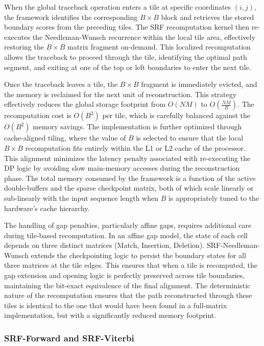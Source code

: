 When the global traceback operation enters a tile at specific coordinates $(i, j)$, the framework identifies the corresponding $B \times B$ block and retrieves the stored boundary scores from the preceding tiles. The SRF recomputation kernel then re-executes the Needleman-Wunsch recurrence within the local tile area, effectively restoring the $B \times B$ matrix fragment on-demand. This localized recomputation allows the traceback to proceed through the tile, identifying the optimal path segment, and exiting at one of the top or left boundaries to enter the next tile.

Once the traceback leaves a tile, the $B \times B$ fragment is immediately evicted, and the memory is reclaimed for the next unit of reconstruction. This strategy effectively reduces the global storage footprint from $O(NM)$ to $O(\frac{NM}{B})$. The recomputation cost is $O(B^2)$ per tile, which is carefully balanced against the $O(B^2)$ memory savings. The implementation is further optimized through cache-aligned tiling, where the value of $B$ is selected to ensure that the local $B \times B$ recomputation fits entirely within the L1 or L2 cache of the processor. This alignment minimizes the latency penalty associated with re-executing the DP logic by avoiding slow main-memory accesses during the reconstruction phase. The total memory consumed by the framework is a function of the active double-buffers and the sparse checkpoint matrix, both of which scale linearly or sub-linearly with the input sequence length when $B$ is appropriately tuned to the hardware's cache hierarchy.

The handling of gap penalties, particularly affine gaps, requires additional care during tile-based recomputation. In an affine gap model, the state of each cell depends on three distinct matrices (Match, Insertion, Deletion). SRF-Needleman-Wunsch extends the checkpointing logic to persist the boundary states for all three matrices at the tile edges. This ensures that when a tile is recomputed, the gap extension and opening logic is perfectly preserved across tile boundaries, maintaining the bit-exact equivalence of the final alignment. The deterministic nature of the recomputation ensures that the path reconstructed through these tiles is identical to the one that would have been found in a full-matrix implementation, but with a significantly reduced memory footprint.

\subsubsection{SRF-Forward and SRF-Viterbi}

